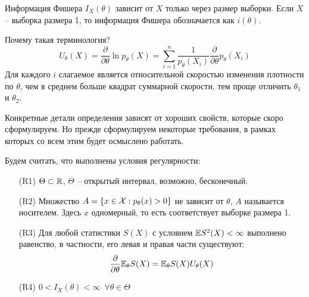 \begin{note}
    Информация Фишера $I_X(\theta)$ зависит от $X$ только через размер выборки. Если $X$ -- выборка размера 1, то информация Фишера обозначается как $i(\theta)$.
\end{note}

\begin{note}
    Почему такая терминология?
    \[
        U_\theta(X) = \frac{\partial}{\partial \theta} \ln p_\theta(X) = \sum_{i=1}^n \frac{1}{p_\theta(X_i)} \frac{\partial}{\partial \theta} p_\theta(X_i)
    \]
    Для каждого $i$ слагаемое является относительной скоростью изменения плотности по $\theta$, чем в среднем больше квадрат суммарной скорости, тем проще отличить $\theta_1$ и $\theta_2$.

    Конкретные детали определения зависят от хороших свойств, которые скоро сформулируем. Но прежде сформулируем некоторые требования, в рамках которых со всем этим будет осмыслено работать.
\end{note}

\begin{definition}
    Будем считать, что выполнены условия регулярности:
    \begin{itemize}
        \item[(R1)] $\Theta \subset \mathbb{R}$, $\Theta$ -- открытый интервал, возможно, бесконечный.

        \item[(R2)] Множество $A = \{x \in \mathcal{X} : p_\theta(x) > 0\}$ не зависит от $\theta$, $A$ называется носителем. Здесь $x$ одномерный, то есть соответствует выборке размера 1.

        \item[(R3)] Для любой статистики $S(X)$ с условием $\mathbb{E} S^2(X) < \infty$ выполнено равенство, в частности, его левая и правая части существуют:
        \[
            \frac{\partial}{\partial \theta} \mathbb{E}_\theta S(X) = \mathbb{E}_\theta S(X) U_\theta(X)
        \]

        \item[(R4)] $0 < I_X(\theta) < \infty \ \ \forall \theta \in \Theta$
    \end{itemize}
\end{definition}

